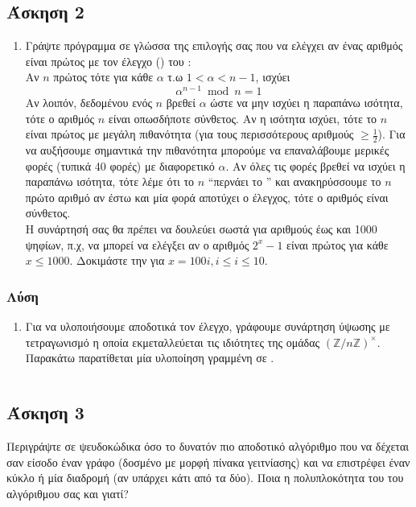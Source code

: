 \documentclass{assignment}
\begin{document}
\newpage\subsection*{Άσκηση 2}
\begin{enumerate}
\item
Γράψτε πρόγραμμα σε γλώσσα της επιλογής σας που να ελέγχει αν ένας αριθμός
είναι πρώτος με τον έλεγχο () του :\\
Αν $n$ πρώτος τότε για κάθε $\alpha$ τ.ω $1 < \alpha < n -1$, ισχύει
\begin{equation*} \alpha^{n-1} \bmod n = 1 \end{equation*}
Αν λοιπόν, δεδομένου ενός $n$ βρεθεί $\alpha$ ώστε να μην ισχύει η παραπάνω
ισότητα, τότε ο αριθμός $n$ είναι οπωσδήποτε σύνθετος. Αν η ισότητα ισχύει,
τότε το $n$ είναι πρώτος με μεγάλη πιθανότητα (για τους περισσότερους αριθμούς
$\ge \frac{1}{2}$). Για να αυξήσουμε σημαντικά την πιθανότητα μπορούμε να 
επαναλάβουμε μερικές φορές (τυπικά 40 φορές) με διαφορετικό $\alpha$. Αν όλες
τις φορές βρεθεί να ισχύει η παραπάνω ισότητα, τότε λέμε ότι το $n$ 
``περνάει το '' και ανακηρύσσουμε το $n$ πρώτο αριθμό αν
έστω και μία φορά αποτύχει ο έλεγχος, τότε ο αριθμός είναι σύνθετος.\\
Η συνάρτησή σας θα πρέπει να δουλεύει σωστά για αριθμούς έως και 1000 ψηφίων,
π.χ, να μπορεί να ελέγξει αν ο αριθμός $2^x-1$ είναι πρώτος για κάθε 
$x \le 1000$. Δοκιμάστε την για $x=100i, i \le i \le 10$. 
\end{enumerate}

\subsubsection*{Λύση}

\begin{enumerate}
\item
Για να υλοποιήσουμε αποδοτικά τον έλεγχο, γράφουμε συνάρτηση
ύψωσης με τετραγωνισμό η οποία εκμεταλλεύεται τις ιδιότητες της
ομάδας $(\mathbb{Z}/n\mathbb{Z})^{\times}$. Παρακάτω παρατίθεται 
μία υλοποίηση γραμμένη σε .

\inputminted{haskell}{HaskellTemp.hs}

\end{enumerate}

\newpage\subsection*{Άσκηση 3}
Περιγράψτε σε ψευδοκώδικα όσο το δυνατόν πιο αποδοτικό αλγόριθμο που να δέχεται
σαν είσοδο έναν γράφο (δοσμένο με μορφή πίνακα γειτνίασης) και να επιστρέφει 
έναν κύκλο  ή μία διαδρομή  (αν υπάρχει κάτι από τα δύο).
Ποια η πολυπλοκότητα του του αλγόριθμου σας και γιατί?
\end{document}
